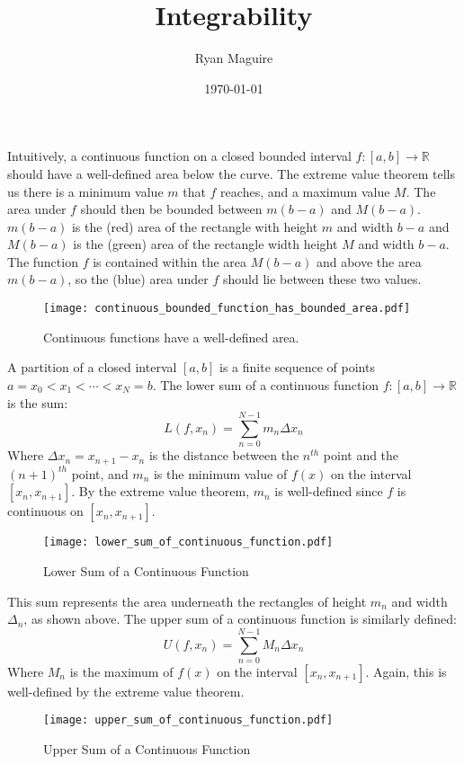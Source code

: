 \documentclass{article}
\title{Integrability}
\author{Ryan Maguire}
\date{\today}
\theoremstyle{plain}
\begin{document}
    \maketitle
    Intuitively, a continuous function on a closed bounded interval
    $f:[a,b]\rightarrow\mathbb{R}$ should have a well-defined area below
    the curve. The extreme value theorem tells us there is a minimum value
    $m$ that $f$ reaches, and a maximum value $M$. The area under $f$ should
    then be bounded between $m(b-a)$ and $M(b-a)$. $m(b-a)$ is the (red) area
    of the rectangle with height $m$ and width $b-a$ and $M(b-a)$ is the
    (green) area of the rectangle width height $M$ and width $b-a$. The
    function $f$ is contained within the area $M(b-a)$ and above the area
    $m(b-a)$, so the (blue) area under $f$ should lie between these two values.
    \begin{figure}
        \centering
        \texttt{[image: continuous\_bounded\_function\_has\_bounded\_area.pdf]}
        \caption{Continuous functions have a well-defined area.}
    \end{figure}
    A partition of a closed interval $[a,b]$ is a finite sequence of points
    $a=x_{0}<x_{1}<\cdots<x_{N}=b$. The lower sum of a continuous function
    $f:[a,b]\rightarrow\mathbb{R}$ is the sum:
    \begin{equation}
        L(f,x_{n})=\sum_{n=0}^{N-1}m_{n}\Delta{x}_{n}
    \end{equation}
    Where $\Delta{x}_{n}=x_{n+1}-x_{n}$ is the distance between the
    $n^{th}$ point and the $(n+1)^{th}$ point, and
    $m_{n}$ is the minimum value of $f(x)$ on the interval $[x_{n},x_{n+1}]$.
    By the extreme value theorem, $m_{n}$ is well-defined since $f$ is
    continuous on $[x_{n},x_{n+1}]$.
    \begin{figure}
        \centering
        \texttt{[image: lower\_sum\_of\_continuous\_function.pdf]}
        \caption{Lower Sum of a Continuous Function}
    \end{figure}
    This sum represents the area underneath the rectangles of height $m_{n}$
    and width $\Delta_{n}$, as shown above. The upper sum of a continuous
    function is similarly defined:
    \begin{equation}
        U(f,x_{n})=\sum_{n=0}^{N-1}M_{n}\Delta{x}_{n}
    \end{equation}
    Where $M_{n}$ is the maximum of $f(x)$ on the interval $[x_{n},x_{n+1}]$.
    Again, this is well-defined by the extreme value theorem.
    \begin{figure}
        \centering
        \texttt{[image: upper\_sum\_of\_continuous\_function.pdf]}
        \caption{Upper Sum of a Continuous Function}
    \end{figure}
\end{document}
